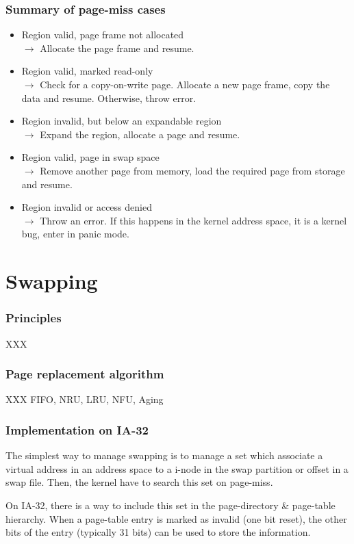 
\begin{frame}
  \frametitle{Summary of page-miss cases}

  \begin{itemize}
  \item
  Region valid, page frame not allocated\\
  $\rightarrow$ Allocate the page frame and resume.
  \item
  Region valid, marked read-only\\
  $\rightarrow$ Check for a copy-on-write page. Allocate a new page
  frame, copy the data and resume. Otherwise, throw error.
  \item
  Region invalid, but below an expandable region\\
  $\rightarrow$ Expand the region, allocate a page and resume.
  \item
  Region valid, page in swap space\\
  $\rightarrow$ Remove another page from memory, load the required
  page from storage and resume.
  \item
  Region invalid or access denied\\
  $\rightarrow$ Throw an error. If this happens in the kernel address
  space, it is a kernel bug, enter in panic mode.
  \end{itemize}

\end{frame}

%
%

\section{Swapping}


\begin{frame}
  \frametitle{Principles}

  XXX
\end{frame}


\begin{frame}
  \frametitle{Page replacement algorithm}

  XXX FIFO, NRU, LRU, NFU, Aging
\end{frame}


\begin{frame}
  \frametitle{Implementation on IA-32}

  The simplest way to manage swapping is to manage a set which
  associate a virtual address in an address space to a i-node in the
  swap partition or offset in a swap file. Then, the kernel have to
  search this set on page-miss.

  \-

  On IA-32, there is a way to include this set in the page-directory
  \& page-table hierarchy. When a page-table entry is marked as
  invalid (one bit reset), the other bits of the entry (typically 31
  bits) can be used to store the information.

\end{frame}

